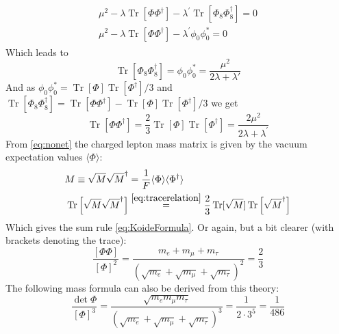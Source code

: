 \documentclass[twoside,twocolumn,11pt]{article} %
\begin{document}
\begin{align}
	\begin{gathered}
		\mu^{2}-\lambda \operatorname{Tr}\left[\Phi \Phi^{\dagger}\right]-\lambda^{\prime} \operatorname{Tr}\left[\Phi_{8} \Phi_{8}^{\dagger}\right]=0 \\
		\mu^{2}-\lambda \operatorname{Tr}\left[\Phi \Phi^{\dagger}\right]-\lambda^{\prime} \phi_{0} \phi_{0}^{*}=0
	\end{gathered}
\end{align}
Which leads to 
\begin{equation}
	\operatorname{Tr}\left[\Phi_{8} \Phi_{8}^{\dagger}\right] = \phi_{0}\phi_{0}^* = \frac{\mu^2}{2\lambda + \lambda'}
\end{equation}
And as $\phi_{0} \phi_{0}^{*}=\operatorname{Tr}[\Phi] \operatorname{Tr}\left[\Phi^{\dagger}\right] / 3$ and $ \operatorname{Tr}\left[\Phi_{8} \Phi_{8}^{\dagger}\right]=\operatorname{Tr}\left[\Phi \Phi^{\dagger}\right]-\operatorname{Tr}[\Phi] \operatorname{Tr}\left[\Phi^{\dagger}\right] / 3$ we get
\begin{equation}
	\operatorname{Tr}\left[\Phi \Phi^{\dagger}\right]=\frac{2}{3} \operatorname{Tr}[\Phi] \operatorname{Tr}\left[\Phi^{\dagger}\right]=\frac{2 \mu^{2}}{2 \lambda+\lambda^{\prime}}\label{eq:tracerelation}
\end{equation}
From \ref{eq:nonet} the charged lepton mass matrix is given by the vacuum expectation values $\langle\Phi\rangle$:
\begin{align}
	M \equiv \sqrt{M}\sqrt{M}^\dagger &= \frac{1}{F}\langle\Phi\rangle \langle\Phi^\dagger\rangle\\
	\operatorname{Tr}\left[\sqrt{M} \sqrt{M}^{\dagger}\right]&\stackrel{\ref{eq:tracerelation}}{=}\frac{2}{3} \operatorname{Tr}[\sqrt{M}] \operatorname{Tr}\left[\sqrt{M}^{\dagger}\right]
\end{align}
Which gives the sum rule \ref{eq:KoideFormula}. Or again, but a bit clearer (with brackets denoting the trace):
\begin{equation}
	\frac{[\Phi \Phi]}{[\Phi]^{2}}=\frac{m_{e}+m_{\mu}+m_{\tau}}{\left(\sqrt{m_{e}}+\sqrt{m_{\mu}}+\sqrt{m_{\tau}}\right)^{2}}=\frac{2}{3}
\end{equation}
The following mass formula can also be derived from this theory:
\begin{equation}
	\frac{\operatorname{det} \Phi}{[\Phi]^{3}}=\frac{\sqrt{m_{e} m_{\mu} m_{\tau}}}{\left(\sqrt{m_{e}}+\sqrt{m_{\mu}}+\sqrt{m_{\tau}}\right)^{3}}=\frac{1}{2 \cdot 3^{5}}=\frac{1}{486}
\end{equation}
\end{document}
